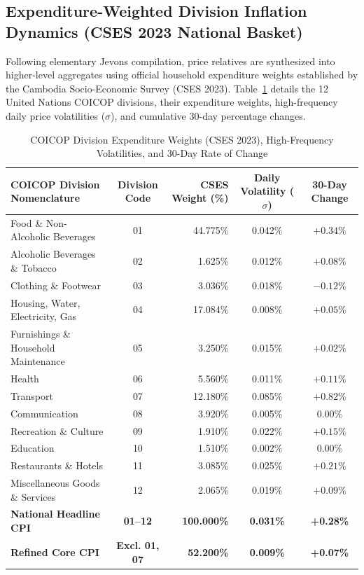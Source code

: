 \subsection{Expenditure-Weighted Division Inflation Dynamics (CSES 2023 National Basket)}
\hs Following elementary Jevons compilation, price relatives are synthesized into higher-level aggregates using official household expenditure weights established by the Cambodia Socio-Economic Survey (CSES 2023). Table~\ref{tab:division_dynamics} details the 12 United Nations COICOP divisions, their expenditure weights, high-frequency daily price volatilities ($\sigma$), and cumulative 30-day percentage changes.

\begin{table}[H]
\centering
\small
\setlength{\tabcolsep}{4pt}
\begin{tabularx}{\textwidth}{|>{\raggedright\arraybackslash}X|c|r|c|c|}
\hline
\rowcolor{blue!20}
\textbf{COICOP Division Nomenclature} & \textbf{Division Code} & \textbf{CSES Weight (\%)} & \textbf{Daily Volatility ($\sigma$)} & \textbf{30-Day Change} \\ \hline
Food \& Non-Alcoholic Beverages & 01 & 44.775\% & 0.042\% & $+0.34\%$ \\ \hline
Alcoholic Beverages \& Tobacco & 02 & 1.625\% & 0.012\% & $+0.08\%$ \\ \hline
Clothing \& Footwear & 03 & 3.036\% & 0.018\% & $-0.12\%$ \\ \hline
Housing, Water, Electricity, Gas & 04 & 17.084\% & 0.008\% & $+0.05\%$ \\ \hline
Furnishings \& Household Maintenance & 05 & 3.250\% & 0.015\% & $+0.02\%$ \\ \hline
Health & 06 & 5.560\% & 0.011\% & $+0.11\%$ \\ \hline
Transport & 07 & 12.180\% & 0.085\% & $+0.82\%$ \\ \hline
Communication & 08 & 3.920\% & 0.005\% & $0.00\%$ \\ \hline
Recreation \& Culture & 09 & 1.910\% & 0.022\% & $+0.15\%$ \\ \hline
Education & 10 & 1.510\% & 0.002\% & $0.00\%$ \\ \hline
Restaurants \& Hotels & 11 & 3.085\% & 0.025\% & $+0.21\%$ \\ \hline
Miscellaneous Goods \& Services & 12 & 2.065\% & 0.019\% & $+0.09\%$ \\ \hline
\textbf{National Headline CPI} & \textbf{01--12} & \textbf{100.000\%} & \textbf{0.031\%} & \textbf{+0.28\%} \\ \hline
\textbf{Refined Core CPI} & \textbf{Excl. 01, 07} & \textbf{52.200\%} & \textbf{0.009\%} & \textbf{+0.07\%} \\ \hline
\end{tabularx}
\caption{COICOP Division Expenditure Weights (CSES 2023), High-Frequency Volatilities, and 30-Day Rate of Change}
\label{tab:division_dynamics}
\end{table}

